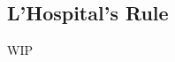 \documentclass[../poma-notes.tex]{subfiles}
\begin{document}
\subsection*{L'Hospital's Rule}

WIP
\end{document}
